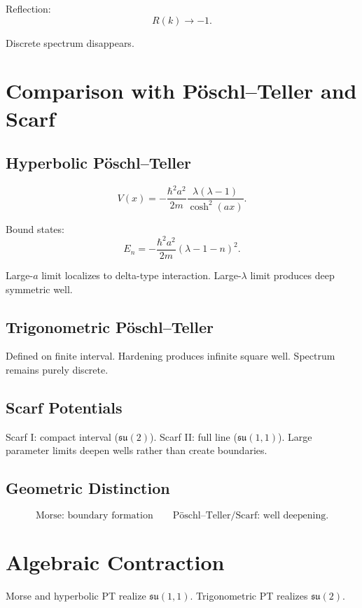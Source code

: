 \documentclass[12pt]{article}
\begin{document}
Reflection:
\[
R(k)\to -1.
\]

Discrete spectrum disappears.

\section{Comparison with P\"oschl--Teller and Scarf}

\subsection{Hyperbolic P\"oschl--Teller}

\[
V(x)=
-\frac{\hbar^2 a^2}{2m}
\frac{\lambda(\lambda-1)}{\cosh^2(ax)}.
\]

Bound states:
\[
E_n=-\frac{\hbar^2 a^2}{2m}(\lambda-1-n)^2.
\]

Large-$a$ limit localizes to delta-type interaction.
Large-$\lambda$ limit produces deep symmetric well.

\subsection{Trigonometric P\"oschl--Teller}

Defined on finite interval.
Hardening produces infinite square well.
Spectrum remains purely discrete.

\subsection{Scarf Potentials}

Scarf I: compact interval ($\mathfrak{su}(2)$).
Scarf II: full line ($\mathfrak{su}(1,1)$).
Large parameter limits deepen wells rather than create boundaries.

\subsection{Geometric Distinction}

\[
\text{Morse: boundary formation}
\qquad
\text{P\"oschl--Teller/Scarf: well deepening}.
\]

\section{Algebraic Contraction}

Morse and hyperbolic PT realize $\mathfrak{su}(1,1)$.
Trigonometric PT realizes $\mathfrak{su}(2)$.
\end{document}
